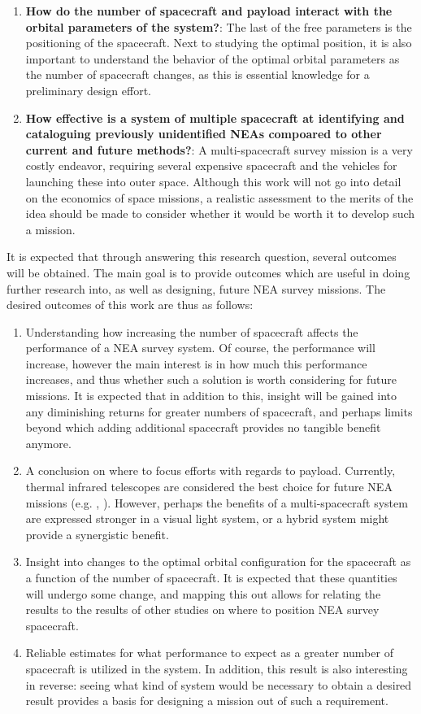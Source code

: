 \begin{enumerate}
 \item \textbf{How do the number of spacecraft and payload interact with the orbital parameters of the system?}: The last of the free parameters is the positioning of the spacecraft. Next to studying the optimal position, it is also important to understand the behavior of the optimal orbital parameters as the number of spacecraft changes, as this is essential knowledge for a preliminary design effort.
 \item \textbf{How effective is a system of multiple spacecraft at identifying and cataloguing previously unidentified NEAs compoared to other current and future methods?}: A multi-spacecraft survey mission is a very costly endeavor, requiring several expensive spacecraft and the vehicles for launching these into outer space. Although this work will not go into detail on the economics of space missions, a realistic assessment to the merits of the idea should be made to consider whether it would be worth it to develop such a mission. 
\end{enumerate}

It is expected that through answering this research question, several outcomes will be obtained. The main goal is to provide outcomes which are useful in doing further research into, as well as designing, future NEA survey missions. The desired outcomes of this work are thus as follows:
\begin{enumerate}
 \item Understanding how increasing the number of spacecraft affects the performance of a NEA survey system. Of course, the performance will increase, however the main interest is in how much this performance increases, and thus whether such a solution is worth considering for future missions. It is expected that in addition to this, insight will be gained into any diminishing returns for greater numbers of spacecraft, and perhaps limits beyond which adding additional spacecraft provides no tangible benefit anymore.
 \item A conclusion on where to focus efforts with regards to payload. Currently, thermal infrared telescopes are considered the best choice for future NEA missions (e.g. \cite{2017NEOSDT}, \cite{ThesisOlga}). However, perhaps the benefits of a multi-spacecraft system are expressed stronger in a visual light system, or a hybrid system might provide a synergistic benefit.
 \item Insight into changes to the optimal orbital configuration for the spacecraft as a function of the number of spacecraft. It is expected that these quantities will undergo some change, and mapping this out allows for relating the results to the results of other studies on where to position NEA survey spacecraft.
 \item Reliable estimates for what performance to expect as a greater number of spacecraft is utilized in the system. In addition, this result is also interesting in reverse: seeing what kind of system would be necessary to obtain a desired result provides a basis for designing a mission out of such a requirement.
\end{enumerate}

